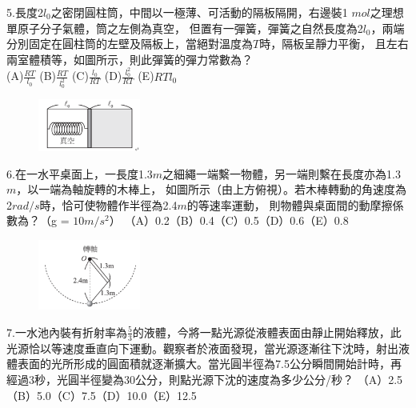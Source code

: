 \documentclass[cn,10pt,math=newtx,chinesefont=founder,device=ig]{elegantbook}
\begin{document}
\newpage

\begin{example}
   5.長度2$l_0$之密閉圓柱筒，中間以一極薄、可活動的隔板隔開，右邊裝1 $mol$之理想單原子分子氣體，筒之左側為真空，
   但置有一彈簧，彈簧之自然長度為2$l_0$，兩端分別固定在圓柱筒的左壁及隔板上，當絕對溫度為$T$時，隔板呈靜力平衡，
   且左右兩室體積等，如圖所示，則此彈簧的彈力常數為？\\
   (A)$\frac{RT}{l_0}$ (B)$\frac{RT}{l_0^2}$ (C)$\frac{l_0}{RT}$ (D)$\frac{l_0^2}{RT}$ (E)$RTl_0$\\
    \rightline{[成德高中教甄109]}
\end{example}
\begin{solution}
    
\end{solution}
\begin{figure}[htbp]
    \flushright
    \includegraphics[width=0.3\textwidth]{image/109成德5.png}
  \end{figure}
\newpage


\begin{example}
   6.在一水平桌面上，一長度1.3$m$之細繩一端繫一物體，另一端則繫在長度亦為1.3$m$，以一端為軸旋轉的木棒上，
   如圖所示（由上方俯視）。若木棒轉動的角速度為2$rad/s$時，恰可使物體作半徑為2.4$m$的等速率運動，
   則物體與桌面間的動摩擦係數為？（g = $10m/s^2$）
   （A）0.2（B）0.4（C）0.5（D）0.6（E）0.8\\
    \rightline{[成德高中教甄109]}
\end{example}
\begin{solution}
    
\end{solution}
\begin{figure}[htbp]
    \flushright
    \includegraphics[width=0.3\textwidth]{image/109成德6.png}
  \end{figure}
\newpage

\begin{example}
   7.一水池內裝有折射率為$\frac{5}{3}$的液體，今將一點光源從液體表面由靜止開始釋放，此光源恰以等速度垂直向下運動。觀察者於液面發現，當光源逐漸往下沈時，射出液體表面的光所形成的圓面積就逐漸擴大。當光圓半徑為7.5公分瞬間開始計時，再經過3秒，光圓半徑變為30公分，則點光源下沈的速度為多少公分/秒？
   （A）2.5（B）5.0（C）7.5（D）10.0（E）12.5
   \\
    \rightline{[成德高中教甄109]}
\end{example}
\begin{solution}
    
\end{solution}
\end{document}
